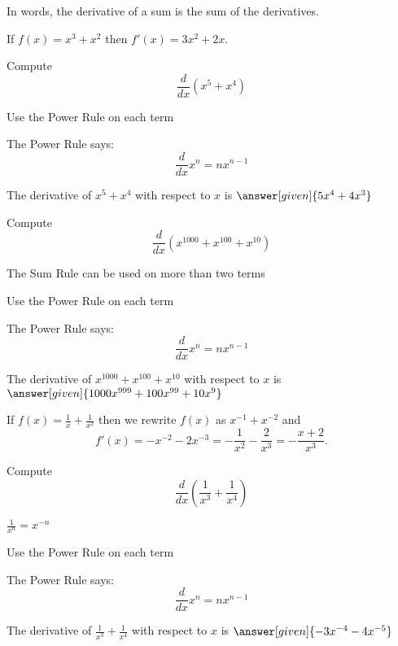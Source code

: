 \documentclass{ximera}
\begin{document}
In words, the derivative of a sum is the sum of the derivatives.


\begin{example} %
If $f(x) = x^3 + x^2$ then $f'(x) = 3x^2 + 2x$.
\end{example}

\begin{problem} %
  Compute 
  \[
  \frac{d}{dx} (x^5 + x^4)
  \]
  
    \begin{hint}
      Use the Power Rule on each term
    \end{hint}
    \begin{hint}
      The Power Rule says:
      \[
      \frac{d}{dx} x^n = nx^{n-1}
      \]
    \end{hint}    
		The derivative of $x^5 + x^4$ with respect to $x$ is
		 $\answer[given]{5x^4 + 4x^3}$
	
\end{problem}

\begin{problem} %
  Compute 
  \[
  \frac{d}{dx} (x^{1000} + x^{100} + x^{10})
  \]
  
    \begin{hint}
		  The Sum Rule can be used on more than two terms
		\end{hint}
		\begin{hint}
      Use the Power Rule on each term
    \end{hint}
    \begin{hint}
      The Power Rule says:
      \[
      \frac{d}{dx} x^n = nx^{n-1}
      \]
    \end{hint}    
		The derivative of $x^{1000} + x^{100} + x^{10}$ with respect to $x$ is
		 $\answer[given]{1000x^{999} + 100x^{99} + 10x^9}$
	
\end{problem}

\begin{example} %
 If $f(x) = \frac{1}{x} + \frac{1}{x^2}$ then we rewrite $f(x)$ as $x^{-1} + x^{-2}$ and 
\[f'(x) = -x^{-2} -2x^{-3} = -\frac{1}{x^2} - \frac{2}{x^3} = - \frac{x + 2}{x^3}.\]
\end{example}

\begin{problem} %
  Compute 
  \[
  \frac{d}{dx} \left(\frac{1}{x^3} + \frac{1}{x^4}\right)
  \]
  
    \begin{hint}
		 $\frac{1}{x^n} = x^{-n}$
		\end{hint}
		\begin{hint}
      Use the Power Rule on each term
    \end{hint}
    \begin{hint}
      The Power Rule says:
      \[
      \frac{d}{dx} x^n = nx^{n-1}
      \]
    \end{hint}    
		The derivative of $\frac{1}{x^3} + \frac{1}{x^4}$ with respect to $x$ is
		 $\answer[given]{-3x^{-4} -4x^{-5}}$
	
\end{problem}
\end{document}
